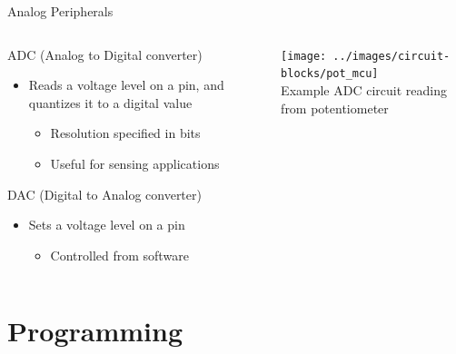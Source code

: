 \documentclass{beamer}
\begin{document}
\begin{frame}{Analog Peripherals}
  \begin{columns}[T]
    \begin{column}{.6\textwidth}
      ADC (Analog to Digital converter)
      \begin{itemize}
        \item Reads a voltage level on a pin, and quantizes it to a digital value
        \begin{itemize}
          \item Resolution specified in bits
          \item Useful for sensing applications
        \end{itemize}
      \end{itemize}
      \phantom{x}
      DAC (Digital to Analog converter)
      \begin{itemize}
        \item Sets a voltage level on a pin
        \begin{itemize}
          \item Controlled from software
        \end{itemize}
      \end{itemize}
    \end{column}

    \begin{column}{0.4\textwidth} \centering
      \texttt{[image: ../images/circuit-blocks/pot\_mcu]} \\
      Example ADC circuit reading from potentiometer
    \end{column}
  \end{columns}
\end{frame}

\section{Programming}
\end{document}
